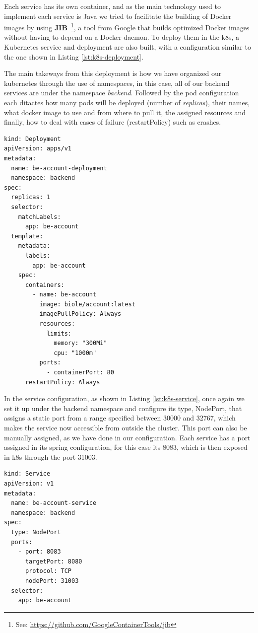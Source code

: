 Each service has its own container, and as the main technology used to implement each service is Java we tried to facilitate the building of Docker images by using \textbf{JIB}~\footnote{See: \url{https://github.com/GoogleContainerTools/jib}}, a tool from Google that builds optimized Docker images without having to depend on a Docker daemon. To deploy them in the \acrshort{k8s}, a Kubernetes service and deployment are also built, with a configuration similar to the one shown in Listing \ref{lst:k8s-deployment}. 

The main takeways from this deployment is how we have organized our kubernetes through the use of namespaces, in this case, all of our backend services are under the namespace \textit{backend}. Followed by the pod configuration each ditactes how many pods will be deployed (number of \textit{replicas}), their names, what docker image to use and from where to pull it, the assigned resources and finally, how to deal with cases of failure (restartPolicy) such as crashes.

\begin{lstlisting}[float,caption={[Microservice Kubernetes deployment configuration]{Example of a \acrshort{k8s} deployment configuration in YAML for a microservice}}, label={lst:k8s-deployment}, captionpos=t]
kind: Deployment
apiVersion: apps/v1
metadata:
  name: be-account-deployment
  namespace: backend
spec:
  replicas: 1
  selector:
    matchLabels:
      app: be-account
  template:
    metadata:
      labels:
        app: be-account
    spec:
      containers:
        - name: be-account
          image: biole/account:latest
          imagePullPolicy: Always
          resources:
            limits:
              memory: "300Mi"
              cpu: "1000m"
          ports:
            - containerPort: 80
      restartPolicy: Always
\end{lstlisting}

In the service configuration, as shown in Listing \ref{lst:k8s-service}, once again we set it up under the backend namespace and configure its type, NodePort, that assigns a static port from a range specified between 30000 and 32767, which makes the service now accessible from outside the cluster. This port can also be manually assigned, as we have done in our configuration. Each service has a port assigned in its spring configuration, for this case its 8083, which is then exposed in \acrshort{k8s} through the port 31003.

\begin{lstlisting}[float, caption={YAML configuration of a Kubernetes service}, label={lst:k8s-service}, captionpos=t]
kind: Service
apiVersion: v1
metadata:
  name: be-account-service
  namespace: backend
spec:
  type: NodePort
  ports:
    - port: 8083
      targetPort: 8080
      protocol: TCP
      nodePort: 31003
  selector:
    app: be-account
\end{lstlisting}

